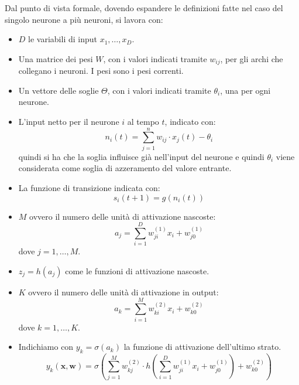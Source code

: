 Dal punto di vista formale, dovendo espandere le definizioni fatte nel caso del
singolo neurone a più neuroni, si lavora con:
\begin{itemize}
    \item $D$ le variabili di input $x_1, \dots, x_D$.
    \item Una matrice dei pesi $W$, con i valori indicati tramite $w_{ij}$, per
          gli archi che collegano i neuroni. I pesi sono i pesi correnti.
    \item Un vettore delle soglie $\Theta$, con i valori indicati tramite $\theta_i$,
          una per ogni neurone.
    \item L'input netto per il neurone $i$ al tempo $t$, indicato con:
          \begin{equation}
              n_i(t) = \sum_{j = 1}^n w_{ij} \cdot x_j(t) - \theta_i
          \end{equation}
          quindi si ha che la soglia influisce già nell'input del neurone e quindi
          $\theta_i$ viene considerata come soglia di azzeramento del valore entrante.
    \item La funzione di transizione indicata con:
          \begin{equation}
              s_i(t + 1) = g(n_i(t))
          \end{equation}
    \item $M$ ovvero il numero delle unità di attivazione nascoste:
          \begin{equation}
              a_j = \sum_{i = 1}^D w_{ji}^{(1)}x_i + w_{j0}^{(1)}
          \end{equation}
          dove $j = 1, \dots, M$.
    \item $z_j = h(a_j)$ come le funzioni di attivazione nascoste.
    \item $K$ ovvero il numero delle unità di attivazione in output:
          \begin{equation}
              a_k = \sum_{i = 1}^M w_{ki}^{(2)}x_i + w_{k0}^{(2)}
          \end{equation}
          dove $k = 1, \dots, K$.
    \item Indichiamo con $y_k = \sigma(a_k)$ la funzione di attivazione dell'ultimo strato.
          \begin{equation}
              y_k(\textbf{x}, \textbf{w}) = \sigma \left(\sum_{j = 1}^M w_{kj}^{(2)} \cdot h \left(\sum_{i = 1}^D w_{ji}^{(1)}x_i + w_{j0}^{(1)}\right) + w_{k0}^{(2)}\right)
          \end{equation}
\end{itemize}

